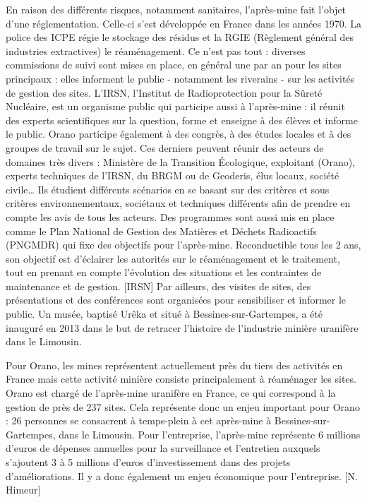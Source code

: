 \documentclass{article}
\begin{document}
En raison des différents risques, notamment sanitaires, l’après-mine fait l’objet d’une réglementation. Celle-ci s’est développée en France dans les années 1970.
 La police des ICPE régie le stockage des résidus et la RGIE (Règlement général des industries extractives) le réaménagement. Ce n’est pas tout : diverses commissions de suivi sont mises en place, en général une par an pour les sites principaux : elles informent le public - notamment les riverains - sur les activités de gestion des sites.
L’IRSN, l’Institut de Radioprotection pour la Sûreté Nucléaire, est un organisme public qui participe aussi à l’après-mine : il réunit des experts scientifiques sur la question, forme et enseigne à des élèves et informe le public. Orano participe également à des congrès, à des études locales et à des groupes de travail sur le sujet. Ces derniers peuvent réunir des acteurs de domaines très divers : Ministère de la Transition Écologique, exploitant (Orano), experts techniques de l’IRSN, du BRGM ou de Geoderis, élus locaux, société civile… Ils étudient différents scénarios en se basant sur des critères et sous critères environnementaux, sociétaux et techniques différents afin de prendre en compte les avis de tous les acteurs.
Des programmes sont aussi mis en place comme le Plan National de Gestion des Matières et Déchets Radioactifs (PNGMDR) qui fixe des objectifs pour l’après-mine. Reconductible tous les  2 ans, son objectif est d’éclairer les autorités sur le réaménagement et le traitement, tout en prenant en compte l’évolution des situations et les contraintes de maintenance et de gestion.  [IRSN]
Par ailleurs, des visites de sites, des présentations et des conférences sont organisées pour sensibiliser et informer le public. Un musée, baptisé Urêka et situé à Bessines-sur-Gartempes, a été inauguré en 2013 dans le but de retracer l’histoire de l’industrie minière uranifère dans le Limousin.

Pour Orano, les mines représentent actuellement près du tiers des activités en France mais cette activité minière consiste principalement à réaménager les sites. Orano est chargé de l’après-mine uranifère en France, ce qui correspond à la gestion de près de 237 sites. Cela représente donc un enjeu important pour Orano : 26 personnes se consacrent à temps-plein à cet après-mine à Bessines-sur-Gartempes, dans le Limousin. Pour l’entreprise, l’après-mine représente 6 millions d’euros de dépenses annuelles pour la surveillance et l’entretien auxquels s’ajoutent 3 à 5 millions d’euros d’investissement dans des projets d’améliorations. Il y a donc également un enjeu économique pour l’entreprise. [N. Himeur]
\end{document}
